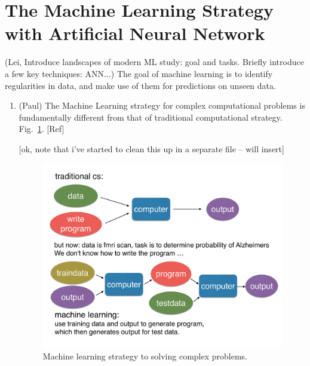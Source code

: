\documentclass[aps,prb,floatfix,amsmath,amssymb,amsfonts,10pt,floatfix,longbibliography]{revtex4-1}
\begin{document}
\section{The Machine Learning Strategy with Artificial Neural Network}
\label{sec:ML}

(Lei, Introduce landscapes of modern ML study: goal and tasks. Briefly introduce a few key techniques: ANN...)
The goal of machine learning is to identify regularities in data, and make use of them for predictions on unseen data. %

\begin{enumerate}


\item (Paul) The Machine Learning strategy for complex computational problems is fundamentally different from that of traditional computational strategy. Fig.~\ref{fig:complex}. {\color{blue}[Ref]} 

[ok, note that i've started to clean this up in a separate file -- will insert]

\begin{figure}[h]
\includegraphics[width=.4\textwidth]{Figures/CS-modes-flow.pdf}
\caption{\label{fig:complex}
Machine learning strategy to solving complex problems.}
\end{figure}



\end{enumerate}
\end{document}
